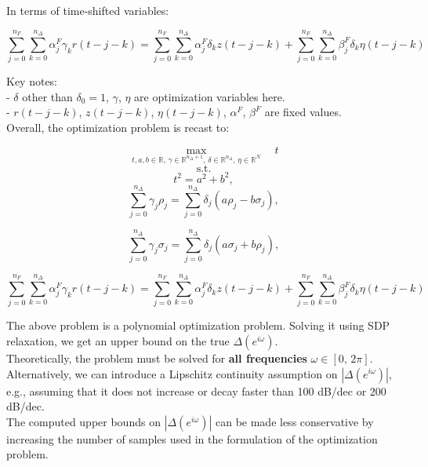 \begin{enumerate}
In terms of time-shifted variables:

\[
\sum_{j=0}^{n_F} \sum_{k=0}^{n_\Delta} \alpha_j^F \gamma_k r(t-j-k) =
\sum_{j=0}^{n_F} \sum_{k=0}^{n_\Delta} \alpha_j^F \delta_k z(t-j-k) +
\sum_{j=0}^{n_F} \sum_{k=0}^{n_\Delta} \beta_j^F \delta_k \eta(t-j-k)
\]

Key notes:\\
- $\delta$ other than $\delta_0 = 1$, $\gamma$, $\eta$ are optimization variables here.\\
- \(r(t-j-k)\), \(z(t-j-k)\),  \(\eta(t-j-k)\), $\alpha^F$, $\beta^F$ are fixed values.\\

Overall, the optimization problem is recast to:


\[
\max\limits_{t, a, b \in \mathbb{R}, \, \gamma \in \mathbb{R}^{n_\Delta + 1}, \, \delta \in \mathbb{R}^{n_\Delta}, \, \eta \in \mathbb{R}^N} \quad t
\]
\[
\text{s.t.}
\]
\[
t^2 = a^2 + b^2,
\]
\[
\sum_{j=0}^{n_\Delta} \gamma_j \rho_j = \sum_{j=0}^{n_\Delta} \delta_j \left( a \rho_j - b \sigma_j \right),
\]

\[
\sum_{j=0}^{n_\Delta} \gamma_j \sigma_j = \sum_{j=0}^{n_\Delta} \delta_j \left( a \sigma_j + b \rho_j \right),
\]

\[
\sum_{j=0}^{n_F} \sum_{k=0}^{n_\Delta} \alpha_j^F \gamma_k r(t-j-k) =
\sum_{j=0}^{n_F} \sum_{k=0}^{n_\Delta} \alpha_j^F \delta_k z(t-j-k) +
\sum_{j=0}^{n_F} \sum_{k=0}^{n_\Delta} \beta_j^F \delta_k \eta(t-j-k)
\]

\end{enumerate}

The above problem is a polynomial optimization problem.
Solving it using SDP relaxation, we get an upper bound on the true $\Delta(e^{i\omega})$.\\

Theoretically, the problem must be solved for\textbf{ all frequencies }$\omega \in [0,\,2 \pi]$. \\
Alternatively, we
can introduce a Lipschitz continuity assumption on $|\Delta(e^{i\omega})|$, e.g., assuming that it does
not increase or decay faster than 100 dB/dec or 200 dB/dec.\\

The computed upper bounds on $|\Delta(e^{i\omega})|$ can be made less conservative by increasing
the number of samples used in the formulation of the optimization problem.

\newpage

